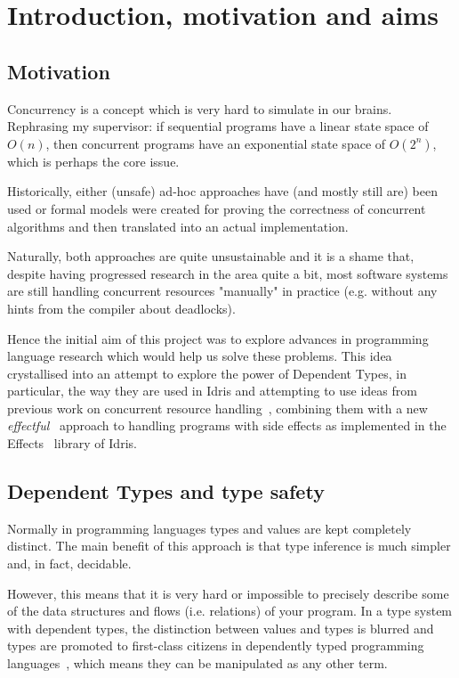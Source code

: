 \section{Introduction, motivation and aims}

\subsection{Motivation}

Concurrency is a concept which is very hard to simulate in our brains.
Rephrasing my supervisor: if sequential programs have a linear state space of
$O(n)$, then concurrent programs have an exponential state space of $O(2^n)$,
which is perhaps the core issue.

Historically, either (unsafe) ad-hoc approaches have (and mostly still are)
been used or formal models were created for proving the correctness of
concurrent algorithms and then translated into an actual implementation.

Naturally, both approaches are quite unsustainable and it is a shame that,
despite having progressed research in the area quite a bit, most software
systems are still handling concurrent resources "manually" in practice (e.g.
without any hints from the compiler about deadlocks).

Hence the initial aim of this project was to explore advances in programming
language research which would help us solve these problems. This idea
crystallised into an attempt to explore the power of Dependent Types, in
particular, the way they are used in Idris and attempting to use ideas from
previous work on concurrent resource handling~\cite{cbconc-fi}, combining them
with a new \emph{effectful}~\cite{eff} approach to handling programs with side
effects as implemented in the Effects~\cite{effects-idr} library of Idris.

\subsection{Dependent Types and type safety}

Normally in programming languages types and values are kept completely
distinct. The main benefit of this approach is that type inference is much
simpler and, in fact, decidable.

However, this means that it is very hard or impossible to precisely
describe some of the data structures and flows (i.e. relations) of your
program. In a type system with dependent types, the distinction between values
and types is blurred and types are promoted to first-class citizens in
dependently typed programming languages~\cite[p.~3]{idris-tutorial}, which
means they can be manipulated as any other term.

